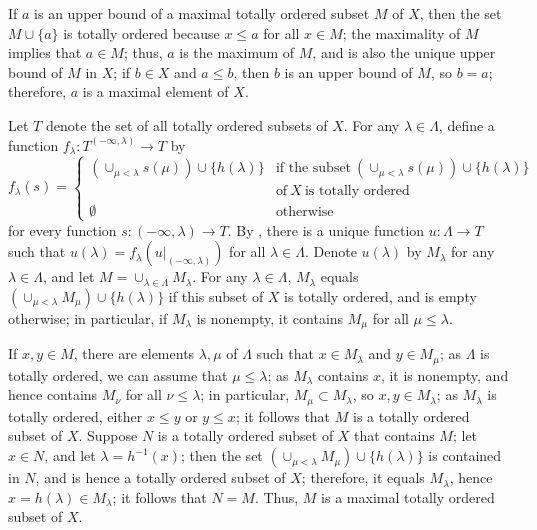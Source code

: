 \documentclass{article}
\begin{document}
\begin{solution}[\ref{exe:9d868h6m}]
  \label{sol:yfgula0x}
  If \(a\) is an upper bound of a maximal totally ordered subset \(M\)
  of \(X\), then the set \(M \cup \{ a \}\) is totally ordered because
  \(x \leq a\) for all \(x \in M\); the maximality of \(M\) implies
  that \(a \in M\); thus, \(a\) is the maximum of \(M\), and is also
  the unique upper bound of \(M\) in \(X\); if \(b \in X\) and
  \(a \leq b\), then \(b\) is an upper bound of \(M\), so \(b = a\);
  therefore, \(a\) is a maximal element of \(X\).

  Let \(T\) denote the set of all totally ordered subsets of \(X\).
  For any \(\lambda \in \Lambda\), define a function
  \(f_\lambda : T^{(-\infty, \lambda)} \to T\) by
  \begin{displaymath}
    f_\lambda(s) =
    \begin{cases}
      (\cup_{\mu < \lambda} s(\mu)) \cup \{ h(\lambda) \}
      & \text{if the subset} ~
        (\cup_{\mu < \lambda} s(\mu)) \cup \{ h(\lambda) \} \\
      & \text{of} ~ X ~ \text{is totally ordered} \\
      \emptyset
      & \text{otherwise}
    \end{cases}
  \end{displaymath}
  for every function \(s : (-\infty, \lambda) \to T\).  By
  , there is a unique function
  \(u : \Lambda \to T\) such that
  \(u(\lambda) = f_\lambda(u \vert_{(-\infty, \lambda)})\) for all
  \(\lambda \in \Lambda\).  Denote \(u(\lambda)\) by \(M_\lambda\) for
  any \(\lambda \in \Lambda\), and let
  \(M = \cup_{\lambda \in \Lambda} M_\lambda\).  For any
  \(\lambda \in \Lambda\), \(M_\lambda\) equals
  \((\cup_{\mu < \lambda} M_\mu) \cup \{ h(\lambda) \}\) if this
  subset of \(X\) is totally ordered, and is empty otherwise; in
  particular, if \(M_\lambda\) is nonempty, it contains \(M_\mu\) for
  all \(\mu \leq \lambda\).

  If \(x, y \in M\), there are elements \(\lambda, \mu\) of
  \(\Lambda\) such that \(x \in M_\lambda\) and \(y \in M_\mu\); as
  \(\Lambda\) is totally ordered, we can assume that
  \(\mu \leq \lambda\); as \(M_\lambda\) contains \(x\), it is
  nonempty, and hence contains \(M_\nu\) for all \(\nu \leq \lambda\);
  in particular, \(M_\mu \subset M_\lambda\), so
  \(x, y \in M_\lambda\); as \(M_\lambda\) is totally ordered, either
  \(x \leq y\) or \(y \leq x\); it follows that \(M\) is a totally
  ordered subset of \(X\).  Suppose \(N\) is a totally ordered subset
  of \(X\) that contains \(M\); let \(x \in N\), and let
  \(\lambda = h^{-1}(x)\); then the set
  \((\cup_{\mu < \lambda} M_\mu) \cup \{ h(\lambda) \}\) is contained
  in \(N\), and is hence a totally ordered subset of \(X\); therefore,
  it equals \(M_\lambda\), hence \(x = h(\lambda) \in M_\lambda\); it
  follows that \(N = M\).  Thus, \(M\) is a maximal totally ordered
  subset of \(X\).
\end{solution}
\end{document}
